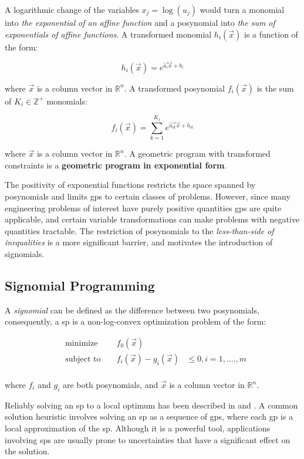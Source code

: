 A logarithmic change of the variables $x_j = \log(u_j)$ would turn a monomial into
{\em  the exponential of an affine function} and a posynomial into
{\em the sum of exponentials of affine functions}. A transformed monomial $h_i(\vec{x})$ is a function of the form:

\begin{displaymath}
    h_i(\vec{x}) = e^{\vec{a_i}\vec{x} + b_i}
\end{displaymath}

where $\vec{x}$ is a column vector in $\mathbb{R}^n$.
A transformed posynomial $f_i(\vec{x})$ is the sum of $K_i \in \mathbb{Z}^+$ monomials:

\begin{displaymath}
    f_i(\vec{x}) = \textstyle{\sum_{k=1}^{K_i}}e^{\vec{a_{ik}}\vec{x} + b_{ik}}
\end{displaymath}

where $\vec{x}$ is a column vector in $\mathbb{R}^n$.
A geometric program with transformed constraints is a \textbf{geometric program in exponential form}.

The positivity of exponential functions restricts the space spanned by posynomials and limits
\gls{gp}s to certain classes of problems.
However, since many engineering problems of interest have purely positive quantities \gls{gp}s
are quite applicable, and certain variable transformations can make problems with negative quantities tractable.
The restriction of posynomials to the \emph{less-than-side of
inequalities} is a more significant barrier, and motivates the introduction of signomials.

\subsection{Signomial Programming}
A {\em signomial} can be defined as the difference between two posynomials, consequently,
a \gls{sp} is a non-log-convex optimization problem of the form:

\begin{equation}
\begin{aligned}
&\text{minimize } && f_{0}(\vec{x}) \\
&\text{subject to } && f_{i}(\vec{x}) - g_{i}(\vec{x})& \leq 0, i = 1, ...., m \\
\end{aligned}
\end{equation}

where $f_{i}$ and $g_{i}$ are both posynomials, and $\vec{x}$ is a column vector in $\mathbb{R}^n$. 

Reliably solving an \gls{sp} to a local optimum has been described in \cite{Boyd2007} and \cite{Lipp2016}.
A common solution heuristic involves solving an \gls{sp} as a sequence of \gls{gp}s,
where each \gls{gp} is a local approximation of the \gls{sp}.
Although it is a powerful tool, applications involving \gls{sp}s are usually prone
to uncertainties that have a significant effect on the solution.
